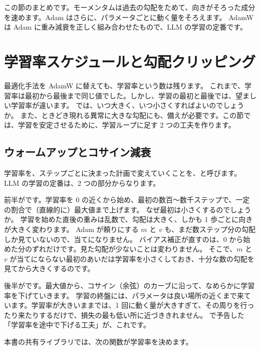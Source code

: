 この節のまとめです。モーメンタムは過去の勾配をためて、向きがそろった成分を速めます。Adam はさらに、パラメータごとに動く量をそろえます。
AdamW は Adam に重み減衰を正しく組み合わせたもので、LLM の学習の定番です。

\section{学習率スケジュールと勾配クリッピング}\label{sec:training-schedule}

最適化手法を AdamW に替えても、学習率という数は残ります。
これまで、学習率は最初から最後まで同じ値でした。しかし、学習の最初と最後では、望ましい学習率が違います。
では、いつ大きく、いつ小さくすればよいのでしょうか。
また、ときどき現れる異常に大きな勾配にも、備えが必要です。この節では、学習を安定させるために、学習ループに足す 2 つの工夫を作ります。

\subsection*{ウォームアップとコサイン減衰}

学習率を、ステップごとに決まった計画で変えていくことを、と呼びます。
LLM の学習の定番は、2 つの部分からなります。

前半がです。学習率を 0 の近くから始め、最初の数百〜数千ステップで、一定の割合で（直線的に）最大値まで上げます。
なぜ最初は小さくするのでしょうか。
学習を始めた直後の重みは乱数で、勾配は大きく、しかも 1 歩ごとに向きが大きく変わります。
Adam が頼りにする $m$ と $v$ も、まだ数ステップ分の勾配しか見ていないので、当てになりません。
バイアス補正が直すのは、0 から始めた分のずれだけです。見た勾配が少ないことは変わりません。
そこで、$m$ と $v$ が当てにならない最初のあいだは学習率を小さくしておき、十分な数の勾配を見てから大きくするのです。

後半がです。最大値から、コサイン（余弦）のカーブに沿って、なめらかに学習率を下げていきます\cite{loshchilov2017sgdr}。
学習の終盤には、パラメータは良い場所の近くまで来ています。学習率が大きいままでは、1 回に動く量が大きすぎて、その周りを行ったり来たりするだけで、損失の最も低い所に近づききれません。
で予告した「学習率を途中で下げる工夫」が、これです。

本書の共有ライブラリでは、次の関数が学習率を決めます。


